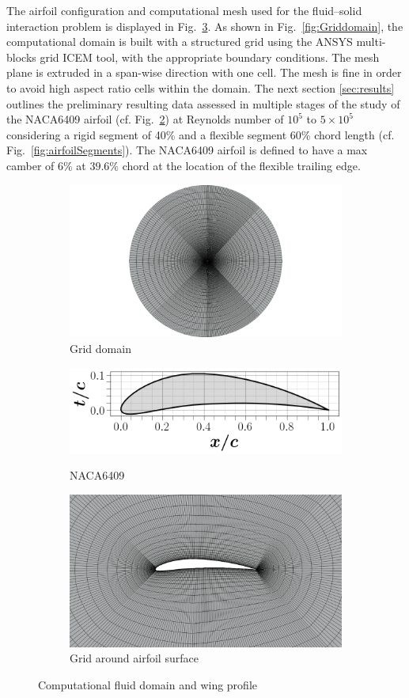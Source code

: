 \documentclass[conf]{new-aiaa}
\begin{document}
The airfoil configuration and computational mesh used for the fluid–solid interaction problem is displayed in Fig.~\ref{fig:Ggeometry}.
%
As shown in Fig.~\ref{fig:Griddomain}, the computational domain is built with a structured grid using the ANSYS multi-blocks grid ICEM tool, with the appropriate boundary conditions.
%
The mesh plane is extruded in a span-wise direction with one cell.
%
The mesh is fine in order to avoid high aspect ratio cells within the domain.
%
The next section \ref{sec:results} outlines the preliminary resulting data assessed in multiple stages of the study of the NACA6409 airfoil (cf. Fig.~\ref{fig:6409}) at Reynolds number of $10^5$ to $5\times 10^5$ considering a rigid segment of 40\% and a flexible segment 60\% chord length (cf. Fig.~\ref{fig:airfoilSegments}).
The NACA6409 airfoil is defined to have a max camber of $ 6\%$ at $39.6\%$ chord at the location of the flexible trailing edge.

\begin{figure}[ht!]
\centering
\begin{subfigure}{.5\textwidth}
\centering
\includegraphics[width=4in]{Figures/Grid.png}
\caption{\label{fig:Griddomain} Grid domain}
\label{fig:airfoildesigna}
\end{subfigure}
\begin{subfigure}{.4\textwidth}
\centering
\includegraphics[width=.6\columnwidth]{figs/naca6409_airfoil.png}
\caption{\label{fig:owl}NACA6409}
\includegraphics[width=.6\columnwidth]{Figures/airfoilGrid.png}
\caption{\label{fig:6409}Grid around airfoil surface}
\end{subfigure}
\caption{Computational fluid domain and wing profile}
\label{fig:Ggeometry}
\end{figure}
%
\end{document}
